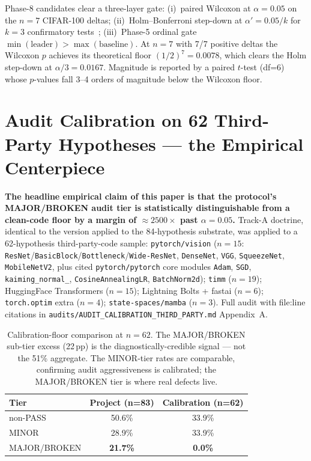\documentclass{article}
\begin{document}
Phase-8 candidates clear a three-layer gate: (i)~paired Wilcoxon at
$\alpha{=}0.05$ on the $n{=}7$ CIFAR-100 deltas; (ii)~Holm--Bonferroni
step-down at $\alpha'{=}0.05/k$ for $k{=}3$ confirmatory
tests~\citep{holm1979}; (iii)~Phase-5 ordinal gate
$\min(\text{leader}) > \max(\text{baseline})$. At $n{=}7$ with 7/7
positive deltas the Wilcoxon $p$ achieves its theoretical floor
$(1/2)^7 = 0.0078$, which clears the Holm step-down at $\alpha/3 =
0.0167$. Magnitude is reported by a paired $t$-test (df=6) whose
$p$-values fall 3--4 orders of magnitude below the Wilcoxon floor.

\section{Audit Calibration on 62 Third-Party Hypotheses --- the Empirical Centerpiece}
\label{sec:third-party}

\textbf{The headline empirical claim of this paper is that the
protocol's MAJOR/BROKEN audit tier is statistically distinguishable
from a clean-code floor by a margin of $\approx 2500\times$ past
$\alpha{=}0.05$.} Track-A doctrine, identical to the version applied
to the 84-hypothesis substrate, was applied to a 62-hypothesis
third-party-code sample: \texttt{pytorch/vision} ($n{=}15$:
\texttt{ResNet}/\texttt{BasicBlock}/\texttt{Bottleneck}/\texttt{Wide-ResNet},
\texttt{DenseNet}, \texttt{VGG}, \texttt{SqueezeNet},
\texttt{MobileNetV2}, plus cited \texttt{pytorch/pytorch} core modules
\texttt{Adam}, \texttt{SGD}, \texttt{kaiming\_normal\_},
\texttt{CosineAnnealingLR}, \texttt{BatchNorm2d}); \texttt{timm}
($n{=}19$); HuggingFace Transformers ($n{=}15$); Lightning Bolts +
fastai ($n{=}6$); \texttt{torch.optim} extra ($n{=}4$);
\texttt{state-spaces/mamba} ($n{=}3$). Full audit with file:line
citations in \texttt{audits/AUDIT\_CALIBRATION\_THIRD\_PARTY.md}
Appendix~A.

\begin{table}[t]
\small\centering
\caption{Calibration-floor comparison at $n{=}62$. The MAJOR/BROKEN
sub-tier excess (22\,pp) is the diagnostically-credible signal --- not
the 51\% aggregate. The MINOR-tier rates are comparable, confirming
audit aggressiveness is calibrated; the MAJOR/BROKEN tier is where
real defects live.}
\label{tab:calibration}
\begin{tabular}{l c c}
\toprule
Tier            & Project (n=83) & Calibration (n=62) \\
\midrule
non-PASS        & 50.6\% & 33.9\% \\
MINOR           & 28.9\% & 33.9\% \\
MAJOR/BROKEN    & \textbf{21.7\%} & \textbf{0.0\%} \\
\bottomrule
\end{tabular}
\end{table}
\end{document}
